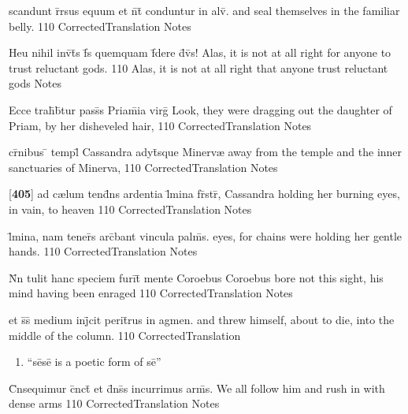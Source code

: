 \latline
  {scandunt r\={}rsus equum et n\={}t\={} conduntur in alv\={}.}
  { and seal themselves in the familiar belly. }
  {110}
  { CorrectedTranslation }
  { Notes }


\latline
  {Heu nihil inv\={\macron {\i}}t\={\macron {\i}}s f\={}s quemquam f\={\macron {\i}}dere d\={\macron {\i}}v\={\macron {\i}}s!}
  { Alas, it is not at all right for anyone to trust reluctant gods. }
  {110}
  { Alas, it is not at all right that anyone trust reluctant gods}
  { Notes }


\latline
  {Ecce trah\={}b\={}tur pass\={\macron {\i}}s Priam\={}ia virg\={}}
  { Look, they were dragging out the daughter of Priam, by her disheveled hair,  }
  {110}
  { CorrectedTranslation }
  { Notes }


\latline
  {cr\={\macron {\i}}nibus \={} templ\={} Cassandra adyt\={\macron {\i}}sque Minerv{\ae}}
  { away from the temple and the inner sanctuaries of Minerva,}
  {110}
  { CorrectedTranslation }
  { Notes }


\latline
  {[\textbf{405}] ad c{\ae}lum tend\={}ns ardentia l\={}mina fr\={}str\={},}
  { Cassandra holding her burning eyes, in vain, to heaven }
  {110}
  { CorrectedTranslation }
  { Notes }


\latline
  {l\={}mina, nam tener\={}s arc\={}bant vincula palm\={}s.}
  { eyes, for chains were holding her gentle hands. }
  {110}
  { CorrectedTranslation }
  { Notes }


\latline
  {N\={}n tulit hanc speciem furi\={}t\={} mente Coroebus}
  { Coroebus bore not this sight, his mind having been enraged }
  {110}
  { CorrectedTranslation }
  { Notes }


\latline
  {et s\={}s\={} medium inj\={}cit perit\={}rus in agmen.}
  { and threw himself, about to die, into the middle of the column. }
  {110}
  { CorrectedTranslation }
  { \begin{enumerate}
  	\item ``s\={e}s\={e} is a poetic form of s\={e}''
  \end{enumerate} }


\latline
  {C\={}nsequimur c\={}nct\={\macron {\i}} et d\={}ns\={\macron {\i}}s incurrimus arm\={\macron {\i}}s.}
  { We all follow him and rush in with dense arms }
  {110}
  { CorrectedTranslation }
  { Notes }



